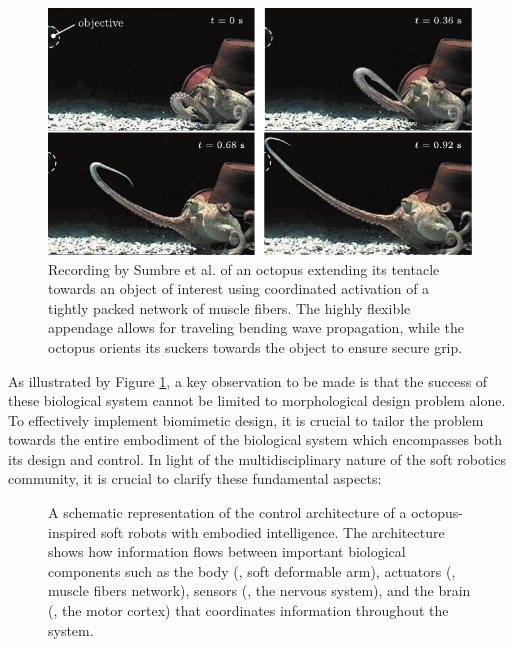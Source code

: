 \begin{figure}
  \centering
  \includegraphics*[width = .75\textwidth]{./pdf/thesis-figure-1-1.pdf}
  \caption{Recording by Sumbre et al. \cite{Sumbre2001Sep} of an octopus extending its tentacle towards an object of interest using coordinated activation of a tightly packed network of muscle fibers. The highly flexible appendage allows for traveling bending wave propagation, while the octopus orients its suckers towards the object to ensure secure grip. \label{fig:C0:octopus}}
  \vspace{-4mm}
\end{figure}

As illustrated by Figure \ref{fig:C0:octopus}, a key observation to be made is that the success of these biological system cannot be limited to morphological design problem alone. To effectively implement biomimetic design, it is crucial to tailor the problem towards the entire embodiment of the biological system which encompasses both its design and control. In light of the multidisciplinary nature of the soft robotics community, it is crucial to clarify these fundamental aspects:


\begin{figure}
  \centering
  
  \caption{A schematic representation of the control architecture of a octopus-inspired soft robots with embodied intelligence. The architecture shows how information flows between important biological components such as the body (\eg, soft deformable arm), actuators (\eg, muscle fibers network), sensors (\eg, the nervous system), and the brain (\eg, the motor cortex) that coordinates information throughout the system. \label{fig:C0:biometic} }
  \vspace{-4mm}
\end{figure}

